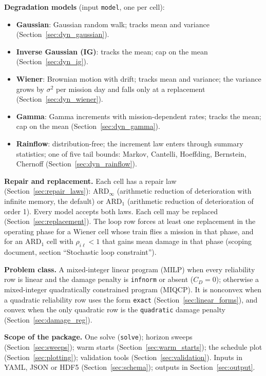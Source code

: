 \documentclass[11pt,a4paper]{article}
\theoremstyle{plain}
\theoremstyle{definition}
\newcommand{\ARDinf}{\mathrm{ARD}_{\infty}}
\newcommand{\ARDone}{\mathrm{ARD}_{1}}
\renewcommand{\_}{\textunderscore\allowbreak{}}
\begin{document}
\textbf{Degradation models} (input \texttt{model}, one per cell):
\begin{itemize}[nosep,leftmargin=1.5em]
  \item \textbf{Gaussian}: Gaussian random walk; tracks mean and variance
        (Section~\ref{sec:dyn_gaussian}).
  \item \textbf{Inverse Gaussian (IG)}: tracks the mean; cap on the mean
        (Section~\ref{sec:dyn_ig}).
  \item \textbf{Wiener}: Brownian motion with drift; tracks mean and variance; the
        variance grows by $\sigma^2$ per mission day and falls only at a replacement
        (Section~\ref{sec:dyn_wiener}).
  \item \textbf{Gamma}: Gamma increments with mission-dependent rates; tracks the mean;
        cap on the mean (Section~\ref{sec:dyn_gamma}).
  \item \textbf{Rainflow}: distribution-free; the increment law enters through summary
        statistics; one of five tail bounds: Markov, Cantelli, Hoeffding, Bernstein,
        Chernoff (Section~\ref{sec:dyn_rainflow}).
\end{itemize}

\textbf{Repair and replacement.} Each cell has a repair law
(Section~\ref{sec:repair_laws}): $\ARDinf$ (arithmetic reduction of deterioration with
infinite memory, the default) or $\ARDone$ (arithmetic reduction of deterioration of
order 1). Every model accepts both laws. Each cell may be replaced
(Section~\ref{sec:replacement}). The loop row forces at least one replacement in the
operating phase for a Wiener cell whose train flies a mission in that phase, and for
an $\ARDone$ cell with $\rho_{i\ell} < 1$ that gains mean damage in that phase
(scoping document, section ``Stochastic loop constraint'').

\textbf{Problem class.} A mixed-integer linear program (MILP) when every reliability
row is linear and the damage penalty is \texttt{inf\_norm} or absent ($C_D = 0$);
otherwise a mixed-integer quadratically constrained program (MIQCP). It is nonconvex
when a quadratic reliability row uses the form \texttt{exact}
(Section~\ref{sec:linear_forms}), and convex when the only quadratic row is the
\texttt{quadratic} damage penalty (Section~\ref{sec:damage_reg}).

\textbf{Scope of the package.} One solve (\texttt{solve}); horizon sweeps
(Section~\ref{sec:sweeps}); warm starts (Section~\ref{sec:warm_starts}); the schedule
plot (Section~\ref{sec:plotting}); validation tools (Section~\ref{sec:validation}).
Inputs in YAML, JSON or HDF5 (Section~\ref{sec:schema}); outputs in
Section~\ref{sec:output}.
\end{document}
